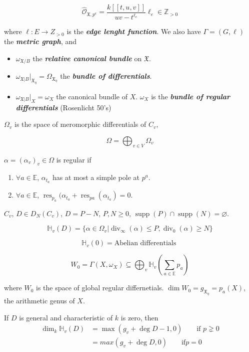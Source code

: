 $$
\hat{\mathcal{O}}_{\mathfrak{X},p^e}=
\dfrac{k[\!\![
t,u,v]\!\!]}{uv-t^{\ell_e}}\ell_e\in
\mathbb{Z}_{>0}
$$

where $\ell:E\longrightarrow Z_{>0}$ is the
\textit{\textbf{edge lenght function}}. We
also have $\Gamma=(G,\ell)$ the
\textit{\textbf{metric graph}}, and
\begin{itemize}
\item $\omega_{\mathfrak{X} /B}$ the
\textit{\textbf{relative canonical bundle
}}on  $\mathfrak{X}$.
\item $\omega_{\mathfrak{X}
|B}|_{\mathfrak{X}_\eta}=\Omega_{
\mathfrak{X}_\eta}$
the \textit{\textbf{bundle of
differentials}}.
\item $\omega_{\mathfrak{X}
|B}|_{X}=\omega_X$ the canonical bundle of
$X$. $\omega_X$ is the \textit{\textbf{bundle
of regular differentials}} (Rosenlicht 50's)
\end{itemize}

\medskip{}
$\Omega_v$ is the space of meromorphic
differentials of $C_v$,

$$
\Omega=\bigoplus_{v\in V} \Omega_v
$$

$\alpha=(\alpha_{v})_{v}\in\Omega$ is regular
if
\begin{enumerate}
\item $\forall a\in\mathbb{E}$,
$\alpha_{t_a}$ has at most a simple pole at
$p^a$.
\item $\forall a\in\mathbb{E}$,
$\operatorname{res}_{p_a}(\alpha_{t_a}+
\operatorname{res}_{pa}(\alpha_{t_a})=0$.
\end{enumerate}

\medskip{}

$C_v$,  $D\in D_N(C_v)$, $D=P-N$,  $P,N\geq
0$, $\operatorname{supp}(P)\cap
\operatorname{supp}(N)=\varnothing$.

$$
\mathbb{H}_v(D)=\{\alpha\in\Omega_v|
\operatorname{div}_\infty(\alpha)\leq
P,\operatorname{div}_0(\alpha)\geq N\}
$$

$$
\mathbb{H}_v\left(0 \right) =\text{Abelian
differentials }
$$

$$
W_0=\Gamma(X,\omega_X)\subseteq \bigoplus_{v}
\mathbb{H}_v\left( \sum_{a\in\mathbb{E}}p_a
\right)
$$

where $W_0$ is the space of global regular
differnetials. $\dim
W_0=g_{\mathfrak{X}_\eta}=p_a(X)$, the
arithmetic genus of $X$.

If $D$ is general and characteristic of  $k$
is zero, then
$$
\begin{aligned}
\dim_k
\mathbb{H}_v(D)&=\max(g_v+
\operatorname{deg}D-1,0)\qquad
\text{if }p\gneq 0\\
&=max(g_v+\operatorname{deg}D,0)\qquad
\text{if} p=0
\end{aligned}
$$


